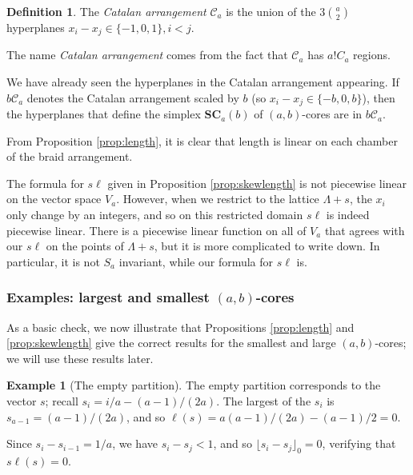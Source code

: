 \documentclass{amsart}[12pt]
\theoremstyle{definition}
\newtheorem{example}[dummy]{Example}
\newtheorem{definition}[dummy]{Definition}
\newcommand{\SC}{\mathbf{SC}}
\newcommand{\sk}{s\ell}
\begin{document}
\begin{definition} \label{def:arrangements}
The \emph{Catalan arrangement} $\mathcal{C}_a$ is the union of the $3\binom{a}{2}$ hyperplanes $x_i-x_j\in\{-1,0,1\}, i<j$.
\end{definition}

The name \emph{Catalan arrangement} comes from the fact that $\mathcal{C}_a$ has $a!C_a$ regions.

We have already seen the hyperplanes in the Catalan arrangement appearing.  If $b\mathcal{C}_a$ denotes the Catalan arrangement scaled by $b$ (so $x_i-x_j\in\{-b,0,b\}$), then the hyperplanes that define the simplex $\SC_a(b)$ of $(a,b)$-cores are in $b\mathcal{C}_a$.

From Proposition \ref{prop:length}, it is clear that length is linear on each chamber of the braid arrangement.  

The formula for $\sk$ given in Proposition \ref{prop:skewlength} is not piecewise linear on the vector space $V_a$.  However, when we restrict to the lattice $\Lambda+s$, the $x_i$ only change by an integers, and so on this restricted domain $\sk$ is indeed piecewise linear.  There is a piecewise linear function on all of $V_a$ that agrees with our $\sk$ on the points of $\Lambda+s$, but it is more complicated to write down.  In particular, it is not $S_a$ invariant, while our formula for $\sk$ is.


\subsubsection{Examples: largest and smallest $(a,b)$-cores}
As a basic check, we now illustrate that Propositions \ref{prop:length} and \ref{prop:skewlength} give the correct results for the smallest and large $(a,b)$-cores; we will use these results later.

\begin{example}[The empty partition]
The empty partition corresponds to the vector $s$; recall $s_i=i/a-(a-1)/(2a)$.  
  The largest of the $s_i$ is $s_{a-1}=(a-1)/(2a)$, and so $\ell(s)=a(a-1)/(2a)-(a-1)/2=0$.  

Since $s_i-s_{i-1}=1/a$, we have $s_i-s_j<1$, and so $\lfloor s_i-s_j\rfloor_0=0$,  verifying that $\sk(s)=0$.




\end{example}
\end{document}

